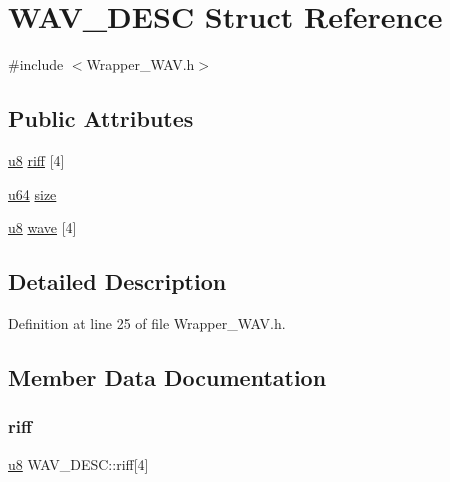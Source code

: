 \hypertarget{struct_w_a_v___d_e_s_c}{}\section{W\+A\+V\+\_\+\+D\+E\+SC Struct Reference}
\label{struct_w_a_v___d_e_s_c}


{\ttfamily \#include $<$Wrapper\+\_\+\+W\+A\+V.\+h$>$}

\subsection*{Public Attributes}
\begin{DoxyCompactItemize}
\item 
\mbox{\hyperlink{_util_8h_aed742c436da53c1080638ce6ef7d13de}{u8}} \mbox{\hyperlink{struct_w_a_v___d_e_s_c_aa676949c26175b9ce912be73c0f41fb3}{riff}} \mbox{[}4\mbox{]}
\item 
\mbox{\hyperlink{_util_8h_ad758b7a5c3f18ed79d2fcd23d9f16357}{u64}} \mbox{\hyperlink{struct_w_a_v___d_e_s_c_ae6ad2ec7f877cb64c6b89961e209bdde}{size}}
\item 
\mbox{\hyperlink{_util_8h_aed742c436da53c1080638ce6ef7d13de}{u8}} \mbox{\hyperlink{struct_w_a_v___d_e_s_c_aba4d38d3f00975867e3f36d3d11ca8b9}{wave}} \mbox{[}4\mbox{]}
\end{DoxyCompactItemize}


\subsection{Detailed Description}


Definition at line 25 of file Wrapper\+\_\+\+W\+A\+V.\+h.



\subsection{Member Data Documentation}
\mbox{\label{struct_w_a_v___d_e_s_c_aa676949c26175b9ce912be73c0f41fb3}} 
\subsubsection{\texorpdfstring{riff}{riff}}
{\footnotesize\ttfamily \mbox{\hyperlink{_util_8h_aed742c436da53c1080638ce6ef7d13de}{u8}} W\+A\+V\+\_\+\+D\+E\+S\+C\+::riff\mbox{[}4\mbox{]}}



